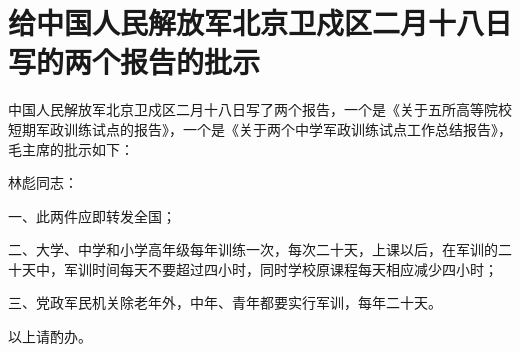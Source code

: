 \section[给中国人民解放军北京卫戍区二月十八日写的两个报告的批示（一九六七年二月十九日）]{给中国人民解放军北京卫戍区二月十八日写的两个报告的批示}


中国人民解放军北京卫戍区二月十八日写了两个报告，一个是《关于五所高等院校短期军政训练试点的报告》，一个是《关于两个中学军政训练试点工作总结报告》，毛主席的批示如下：

林彪同志：

一、此两件应即转发全国；

二、大学、中学和小学高年级每年训练一次，每次二十天，上课以后，在军训的二十天中，军训时间每天不要超过四小时，同时学校原课程每天相应减少四小时；

三、党政军民机关除老年外，中年、青年都要实行军训，每年二十天。

以上请酌办。

